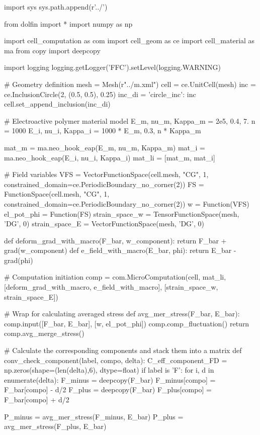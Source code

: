 \documentclass[10pt,a4paper]{scrreprt}
\begin{document}
\begin{python}
import sys
sys.path.append(r'../')

from dolfin import *
import numpy as np

import cell_computation as com
import cell_geom as ce
import cell_material as ma
from copy import deepcopy

import logging
logging.getLogger('FFC').setLevel(logging.WARNING)

# Geometry definition
mesh = Mesh(r"../m.xml")
cell = ce.UnitCell(mesh)
inc = ce.InclusionCircle(2, (0.5, 0.5), 0.25)
inc_di = {'circle_inc': inc}
cell.set_append_inclusion(inc_di)

# Electroactive polymer material model
E_m, nu_m, Kappa_m = 2e5, 0.4, 7.
n = 1000  
E_i, nu_i, Kappa_i = 1000 * E_m, 0.3, n * Kappa_m

mat_m = ma.neo_hook_eap(E_m, nu_m, Kappa_m)
mat_i = ma.neo_hook_eap(E_i, nu_i, Kappa_i)
mat_li = [mat_m, mat_i]

# Field variables
VFS = VectorFunctionSpace(cell.mesh, "CG", 1,
                          constrained_domain=ce.PeriodicBoundary_no_corner(2))
FS = FunctionSpace(cell.mesh, "CG", 1,
                   constrained_domain=ce.PeriodicBoundary_no_corner(2))
w = Function(VFS)
el_pot_phi = Function(FS)
strain_space_w = TensorFunctionSpace(mesh, 'DG', 0)
strain_space_E = VectorFunctionSpace(mesh, 'DG', 0)

def deform_grad_with_macro(F_bar, w_component):
    return F_bar + grad(w_component)
def e_field_with_macro(E_bar, phi):
    return E_bar - grad(phi)

# Computation initiation
comp = com.MicroComputation(cell, mat_li,
                        [deform_grad_with_macro, e_field_with_macro],
                        [strain_space_w, strain_space_E])

# Wrap for calculating averaged stress
def avg_mer_stress(F_bar, E_bar):
    comp.input([F_bar, E_bar], [w, el_pot_phi])
    comp.comp_fluctuation()
    return comp.avg_merge_stress()
    
# Calculate the corresponding components and stack them into a matrix
def conv_check_component(label, compo, delta):
    C_eff_component_FD = np.zeros(shape=(len(delta),6), dtype=float)
    if label is 'F':
        for i, d in enumerate(delta):
            F_minus = deepcopy(F_bar)
            F_minus[compo] = F_bar[compo] - d/2
            F_plus = deepcopy(F_bar)
            F_plus[compo] = F_bar[compo] + d/2

            P_minus = avg_mer_stress(F_minus, E_bar)
            P_plus  = avg_mer_stress(F_plus, E_bar)
            

\end{python}
\end{document}
